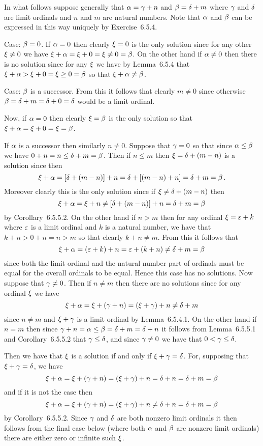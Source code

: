 \begin{solution}
    \mainprob
    
    In what follows suppose generally that $\alpha = \gamma + n$ and $\beta = \delta + m$ where $\gamma$ and $\delta$ are limit ordinals and $n$ and $m$ are natural numbers.
    Note that $\alpha$ and $\beta$ can be expressed in this way uniquely by Exercise~6.5.4.

    Case: $\beta = 0$.
    If $\alpha = 0$ then clearly $\xi = 0$ is the only solution since for any other $\xi \neq 0$ we have $\xi + \alpha = \xi + 0 = \xi \neq 0 = \beta$.
    On the other hand if $\alpha \neq 0$ then there is no solution since for any $\xi$ we have by Lemma~6.5.4 that $\xi + \alpha > \xi + 0 = \xi \geq 0 = \beta$ so that $\xi + \alpha \neq \beta$.

    Case: $\beta$ is a successor.
    From this it follows that clearly $m \neq 0$ since otherwise $\beta = \delta + m = \delta + 0 = \delta$ would be a limit ordinal.

    Now, if $\alpha = 0$ then clearly $\xi = \beta$ is the only solution so that $\xi + \alpha = \xi + 0 = \xi = \beta$.

    If $\alpha$ is a successor then similarly $n \neq 0$.
    Suppose that $\gamma = 0$ so that since $\alpha \leq \beta$ we have $0 + n = n \leq \delta + m = \beta$.
    Then if $n \leq m$ then $\xi = \delta + (m - n)$ is a solution since then
    $$
    \xi + \alpha = [\delta + (m-n)] + n = \delta + [(m-n) + n] = \delta + m = \beta \,.
    $$
    Moreover clearly this is the only solution since if $\xi \neq \delta + (m-n)$ then
    $$
    \xi + \alpha = \xi + n \neq [\delta + (m-n)] + n = \delta + m = \beta
    $$
    by Corollary~6.5.5.2.
    On the other hand if $n > m$ then for any ordinal $\xi = \varepsilon + k$ where $\varepsilon$ is a limit ordinal and $k$ is a natural number, we have that $k + n > 0 + n = n > m$ so that clearly $k + n \neq m$.
    From this it follows that
    $$
    \xi + \alpha = (\varepsilon + k) + n = \varepsilon + (k + n) \neq \delta + m = \beta
    $$
    since both the limit ordinal and the natural number part of ordinals must be equal for the overall ordinals to be equal.
    Hence this case has no solutions.
    Now suppose that $\gamma \neq 0$.
    Then if $n \neq m$ then there are no solutions since for any ordinal $\xi$ we have
    $$
    \xi + \alpha = \xi + (\gamma + n) = (\xi + \gamma) + n \neq \delta + m
    $$
    since $n \neq m$ and $\xi + \gamma$ is a limit ordinal by Lemma~6.5.4.1.
    On the other hand if $n = m$ then since $\gamma + n = \alpha \leq \beta = \delta + m = \delta + n$ it follows from Lemma~6.5.5.1 and Corollary~6.5.5.2 that $\gamma \leq \delta$, and since $\gamma \neq 0$ we have that $0 < \gamma \leq \delta$.

    Then we have that $\xi$ is a solution if and only if $\xi + \gamma = \delta$.
    For, supposing that $\xi + \gamma = \delta$, we have
    $$
    \xi + \alpha = \xi + (\gamma + n) = (\xi + \gamma) + n = \delta + n = \delta + m = \beta
    $$
    and if it is not the case then
    $$
    \xi + \alpha = \xi + (\gamma + n) = (\xi + \gamma) + n \neq \delta + n = \delta + m = \beta
    $$
    by Corollary~6.5.5.2.
    Since $\gamma$ and $\delta$ are both nonzero limit ordinals it then follows from the final case below (where both $\alpha$ and $\beta$ are nonzero limit ordinals) there are either zero or infinite such $\xi$.


\end{solution}
